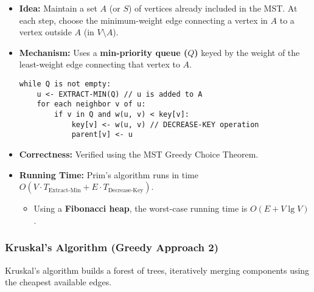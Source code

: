 \documentclass{article}
\begin{document}
\begin{itemize}
    \item \textbf{Idea:} Maintain a set $A$ (or $S$) of vertices already included in the MST. At each step, choose the minimum-weight edge connecting a vertex in $A$ to a vertex outside $A$ (in $V \setminus A$).
    \item \textbf{Mechanism:} Uses a \textbf{min-priority queue ($Q$)} keyed by the weight of the least-weight edge connecting that vertex to $A$.
    \begin{verbatim}
while Q is not empty:
    u <- EXTRACT-MIN(Q) // u is added to A
    for each neighbor v of u:
        if v in Q and w(u, v) < key[v]:
            key[v] <- w(u, v) // DECREASE-KEY operation
            parent[v] <- u
    \end{verbatim}
    \item \textbf{Correctness:} Verified using the MST Greedy Choice Theorem.
    \item \textbf{Running Time:} Prim's algorithm runs in time $O(V \cdot T_{\text{Extract-Min}} + E \cdot T_{\text{Decrease-Key}})$.
    \begin{itemize}
        \item Using a \textbf{Fibonacci heap}, the worst-case running time is $O(E + V \lg V)$.
    \end{itemize}
\end{itemize}

\subsubsection*{Kruskal’s Algorithm (Greedy Approach 2)}
Kruskal's algorithm builds a forest of trees, iteratively merging components using the cheapest available edges.
\end{document}
